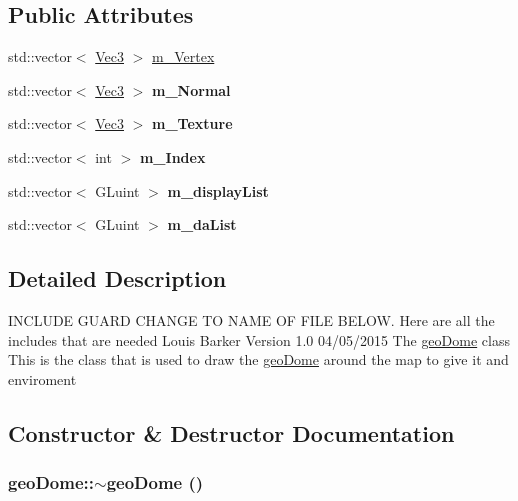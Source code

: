 \subsection*{Public Attributes}
\begin{DoxyCompactItemize}
\item 
std::vector$<$ \hyperlink{classVec3}{Vec3} $>$ \hyperlink{classgeoDome_a6dd17fd379ccbcbc7c1acd678dc5a358}{m\_\-Vertex}
\item 
\hypertarget{classgeoDome_afaa733445b3c1be1fcc2b7fab093be24}{
std::vector$<$ \hyperlink{classVec3}{Vec3} $>$ {\bfseries m\_\-Normal}}
\label{classgeoDome_afaa733445b3c1be1fcc2b7fab093be24}

\item 
\hypertarget{classgeoDome_ac782368baa5686551cf8e15f554cb4d7}{
std::vector$<$ \hyperlink{classVec3}{Vec3} $>$ {\bfseries m\_\-Texture}}
\label{classgeoDome_ac782368baa5686551cf8e15f554cb4d7}

\item 
\hypertarget{classgeoDome_a69cf54228a707f62d2073313a9eb1f88}{
std::vector$<$ int $>$ {\bfseries m\_\-Index}}
\label{classgeoDome_a69cf54228a707f62d2073313a9eb1f88}

\item 
\hypertarget{classgeoDome_af9208a7556780b13688900ed242ee089}{
std::vector$<$ GLuint $>$ {\bfseries m\_\-displayList}}
\label{classgeoDome_af9208a7556780b13688900ed242ee089}

\item 
\hypertarget{classgeoDome_ab3b846843b43b068d28e5ea9a9faca3e}{
std::vector$<$ GLuint $>$ {\bfseries m\_\-daList}}
\label{classgeoDome_ab3b846843b43b068d28e5ea9a9faca3e}

\end{DoxyCompactItemize}


\subsection{Detailed Description}
INCLUDE GUARD CHANGE TO NAME OF FILE BELOW. Here are all the includes that are needed Louis Barker Version 1.0 04/05/2015 The \hyperlink{classgeoDome}{geoDome} class This is the class that is used to draw the \hyperlink{classgeoDome}{geoDome} around the map to give it and enviroment 

\subsection{Constructor \& Destructor Documentation}
\hypertarget{classgeoDome_aa4b805a9a85dfd8eb9d8c815c15621d2}{
\subsubsection[{$\sim$geoDome}]{\setlength{\rightskip}{0pt plus 5cm}geoDome::$\sim$geoDome ()}}
\label{classgeoDome_aa4b805a9a85dfd8eb9d8c815c15621d2}


